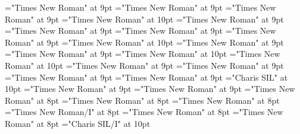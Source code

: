 \documentclass[gps1,twoside]{article}
\begin{document}
\font\sensespanspandiventryletData="Times New Roman" at 9pt
\font\spansensespanspandiventryletData="Times New Roman" at 9pt
\font\partofspeechspansensespanspandiventryletData="Times New Roman" at 9pt
\font\spanenpartofspeechspansensespanspandiventryletData="Times New Roman" at 10pt
\font\spanpartofspeechmorphosyntaxanalysissensesensessubentrysubentriesentrylastchildafterpartofspeechspansensespanspandiventryletData="Times New Roman" at 9pt
\font\spanspansensespanspandiventryletData="Times New Roman" at 9pt
\font\slotspanspansensespanspandiventryletData="Times New Roman" at 9pt
\font\spanslotspanspansensespanspandiventryletData="Times New Roman" at 9pt
\font\spanenspanslotspanspansensespanspandiventryletData="Times New Roman" at 10pt
\font\spannameacademicdomainacademicdomainssensesensessensesensessubentrysubentriesentryfirstchildbeforespanslotspanspansensespanspandiventryletData="Times New Roman" at 9pt
\font\spannameacademicdomainacademicdomainssensesensessensesensessubentrysubentriesentrylastchildafterspanslotspanspansensespanspandiventryletData="Times New Roman" at 9pt
\font\spanenspansensespanspandiventryletData="Times New Roman" at 10pt
\font\spandefinitionorglossreferencedentryreferencedentriescomplexformentryrefcomplexformentryrefsminorentryvariantfirstchildbeforespansensespanspandiventryletData="Times New Roman" at 10pt
\font\spandefinitionorglosssensesensessensesensessubentrysubentriesentrylastchildafterspansensespanspandiventryletData="Times New Roman" at 9pt
\font\pronunciationsentryafterdiventryletData="Times New Roman" at 9pt
\font\pronunciationspandiventryletData="Times New Roman" at 9pt
\font\spanpronunciationspandiventryletData="Times New Roman" at 9pt
\font\spanbzhfonipaspanpronunciationspandiventryletData="Charis SIL" at 10pt
\font\spanformpronunciationpronunciationssubentrysubentriesentryfirstchildbeforespanpronunciationspandiventryletData="Times New Roman" at 9pt
\font\spanformpronunciationpronunciationssubentrysubentriesentrylastchildafterspanpronunciationspandiventryletData="Times New Roman" at 9pt
\font\examplespansensespanspandiventryletData="Times New Roman" at 8pt
\font\examplebeforespansensespanspandiventryletData="Times New Roman" at 8pt
\font\exampleafterspansensespanspandiventryletData="Times New Roman" at 8pt
\font\exampleexamplespansensespanspandiventryletData="Times New Roman/I" at 8pt
\font\examplebeforeexamplespansensespanspandiventryletData="Times New Roman" at 8pt
\font\exampleafterexamplespansensespanspandiventryletData="Times New Roman" at 8pt
\font\spanbzhexampleexamplespansensespanspandiventryletData="Charis SIL/I" at 10pt
\end{document}
